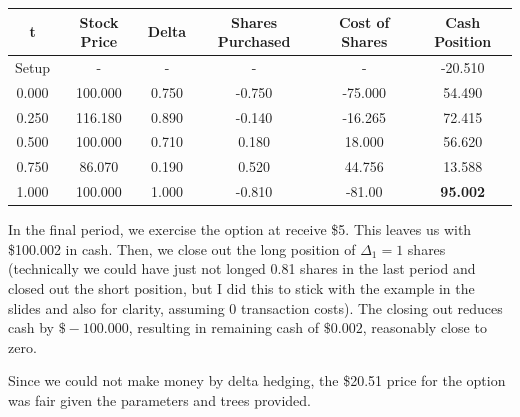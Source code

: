 \documentclass[11pt]{scrartcl}
\begin{document}
\begin{table}[H] \centering
\begin{tabu}{cccccc}
\toprule
t & Stock Price & Delta & Shares Purchased & Cost of Shares & Cash Position \\
\midrule
Setup & - & - & - & - & -20.510 \\
 & 100.000 & 0.750 & -0.750 & -75.000 & 54.490 \\
0.250 & 116.180 & 0.890 & -0.140 & -16.265 & 72.415 \\
0.500 & 100.000 & 0.710 & 0.180 & 18.000 & 56.620 \\
0.750 & 86.070 & 0.190 & 0.520 & 44.756 & 13.588 \\
1.000 & 100.000 & 1.000 & -0.810 & -81.00 & \textbf{95.002} \\
\bottomrule
\end{tabu}
\end{table}

In the final period, we exercise the option at receive \$5. This leaves us with \$100.002 in cash. Then, we close out the long position of $\Delta_{1} = 1$ shares (technically we could have just not longed 0.81 shares in the last period and closed out the short position, but I did this to stick with the example in the slides and also for clarity, assuming 0 transaction costs). The closing out reduces cash by $\$-100.000$, resulting in remaining cash of $\$0.002$, reasonably close to zero.

Since we could not make money by delta hedging, the \$20.51 price for the option was fair given the parameters and trees provided.
\end{document}
